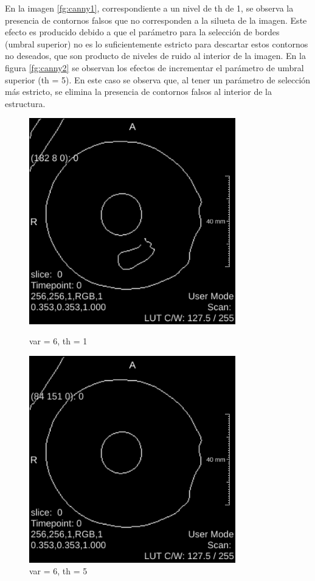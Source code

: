 \documentclass{article}
\begin{document}
En la imagen \ref{fg:canny1}, correspondiente a un nivel de th de 1, se observa la presencia de contornos falsos que no corresponden a la silueta de la imagen. Este efecto es producido debido a que el parámetro para la selección de bordes (umbral superior) no es lo suficientemente estricto para descartar estos contornos no deseados, que son producto de niveles de ruido al interior de la imagen. En la figura \ref{fg:canny2} se observan los efectos de incrementar el parámetro de umbral superior (th = 5). En este caso se observa que, al tener un parámetro de selección más estricto, se elimina la presencia de contornos falsos al interior de la estructura.

\begin{figure}[ht]
\centering
\begin{minipage}{.5\textwidth}
  \centering
  \includegraphics[width=0.8\textwidth]{2canny/2_canny_var_6_th_1_with_scale}
  \caption{var = 6, th = 1}
\label{fg:canny3}
\end{minipage}%
\begin{minipage}{.5\textwidth}
  \centering
  \includegraphics[width=0.8\textwidth]{2canny/2_canny_var_6_th_5_with_scale}
  \caption{var = 6, th = 5}
\label{fg:canny4}
\end{minipage}
\end{figure}
\FloatBarrier
\end{document}
